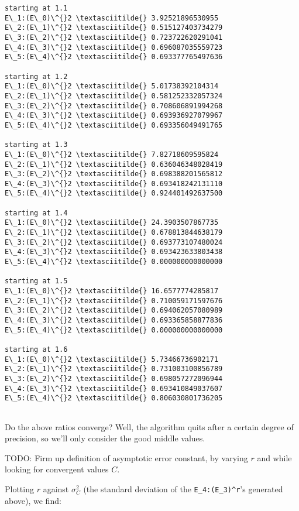 \documentclass[11pt]{article}
\begin{document}
    \begin{Verbatim}[fontsize=\small,commandchars=\\\{\}]
starting at 1.1
E\_1:(E\_0)\^{}2 \textasciitilde{} 3.92521896530955
E\_2:(E\_1)\^{}2 \textasciitilde{} 0.515127403734279
E\_3:(E\_2)\^{}2 \textasciitilde{} 0.723722620291041
E\_4:(E\_3)\^{}2 \textasciitilde{} 0.696087035559723
E\_5:(E\_4)\^{}2 \textasciitilde{} 0.693377765497636

starting at 1.2
E\_1:(E\_0)\^{}2 \textasciitilde{} 5.01738392104314
E\_2:(E\_1)\^{}2 \textasciitilde{} 0.581252332057324
E\_3:(E\_2)\^{}2 \textasciitilde{} 0.708606891994268
E\_4:(E\_3)\^{}2 \textasciitilde{} 0.693936927079967
E\_5:(E\_4)\^{}2 \textasciitilde{} 0.693356049491765

starting at 1.3
E\_1:(E\_0)\^{}2 \textasciitilde{} 7.82718609595824
E\_2:(E\_1)\^{}2 \textasciitilde{} 0.636046348028419
E\_3:(E\_2)\^{}2 \textasciitilde{} 0.698388201565812
E\_4:(E\_3)\^{}2 \textasciitilde{} 0.693418242131110
E\_5:(E\_4)\^{}2 \textasciitilde{} 0.924401492637500

starting at 1.4
E\_1:(E\_0)\^{}2 \textasciitilde{} 24.3903507867735
E\_2:(E\_1)\^{}2 \textasciitilde{} 0.678813844638179
E\_3:(E\_2)\^{}2 \textasciitilde{} 0.693773107480024
E\_4:(E\_3)\^{}2 \textasciitilde{} 0.693423633803438
E\_5:(E\_4)\^{}2 \textasciitilde{} 0.000000000000000

starting at 1.5
E\_1:(E\_0)\^{}2 \textasciitilde{} 16.6577774285817
E\_2:(E\_1)\^{}2 \textasciitilde{} 0.710059171597676
E\_3:(E\_2)\^{}2 \textasciitilde{} 0.694062057080989
E\_4:(E\_3)\^{}2 \textasciitilde{} 0.693365858877836
E\_5:(E\_4)\^{}2 \textasciitilde{} 0.000000000000000

starting at 1.6
E\_1:(E\_0)\^{}2 \textasciitilde{} 5.73466736902171
E\_2:(E\_1)\^{}2 \textasciitilde{} 0.731003100856789
E\_3:(E\_2)\^{}2 \textasciitilde{} 0.698057272096944
E\_4:(E\_3)\^{}2 \textasciitilde{} 0.693410849037607
E\_5:(E\_4)\^{}2 \textasciitilde{} 0.806030801736205


    \end{Verbatim}

    Do the above ratios converge? Well, the algorithm quits after a certain
degree of precision, so we'll only consider the good middle values.

TODO: Firm up definition of asymptotic error constant, by varying \(r\)
and while looking for convergent values \(C\).

Plotting \(r\) against \(\sigma^2_C\) (the standard deviation of the
\texttt{E\_4:(E\_3)\^{}r}'s generated above), we find:
\end{document}
